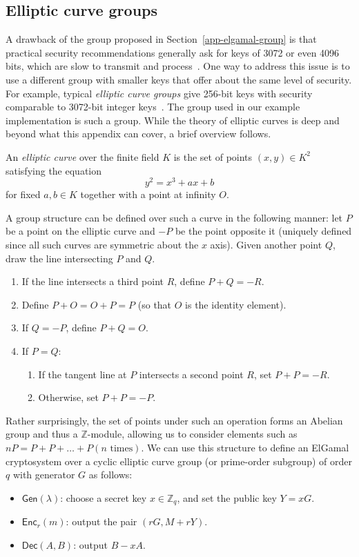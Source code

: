 \documentclass[12pt,a4paper]{article}
\theoremstyle{definition}
\begin{document}
\subsection{Elliptic curve groups}
A drawback of the group proposed in Section~\ref{app-elgamal-group} is that practical security recommendations generally ask for keys of 3072 or even 4096 bits, which are slow to transmit and process~\cite{barker2018transitioning}. One way to address this issue is to use a different group with smaller keys that offer about the same level of security. For example, typical \textit{elliptic curve groups} give 256-bit keys with security comparable to 3072-bit integer keys~\cite{bafandehkar2013comparison}. The group used in our example implementation is such a group. While the theory of elliptic curves is deep and beyond what this appendix can cover, a brief overview follows.

\begin{definition}
    An \textit{elliptic curve} over the finite field $K$ is the set of points $(x, y)\in K^2$ satisfying the equation
    $$y^2 = x^3 + ax + b$$
    for fixed $a, b\in K$ together with a point at infinity $O$.
\end{definition}

A group structure can be defined over such a curve in the following manner: let $P$ be a point on the elliptic curve and $-P$ be the point opposite it (uniquely defined since all such curves are symmetric about the $x$ axis). Given another point $Q$, draw the line intersecting $P$ and $Q$.
\begin{enumerate}
    \item If the line intersects a third point $R$, define $P + Q = -R$.
    \item Define $P + O = O + P = P$ (so that $O$ is the identity element).
    \item If $Q = -P$, define $P + Q = O$.
    \item If $P = Q$:
    \begin{enumerate}
        \item If the tangent line at $P$ intersects a second point $R$, set $P + P = -R$.
        \item Otherwise, set $P + P = -P$.
    \end{enumerate}
\end{enumerate}
Rather surprisingly, the set of points under such an operation forms an Abelian group and thus a $\mathbb{Z}$-module, allowing us to consider elements such as $nP = P + P + \ldots + P (n \text{ times})$. We can use this structure to define an ElGamal cryptosystem over a cyclic elliptic curve group (or prime-order subgroup) of order $q$ with generator $G$ as follows:
\begin{itemize}
    \item $\mathsf{Gen}(\lambda)$: choose a secret key $x\in\mathbb{Z}_q$, and set the public key $Y = xG$.
    \item $\mathsf{Enc}_r(m)$: output the pair $(rG, M + rY)$.
    \item $\mathsf{Dec}(A, B)$: output $B - xA$.
\end{itemize}
\newpage
\end{document}
